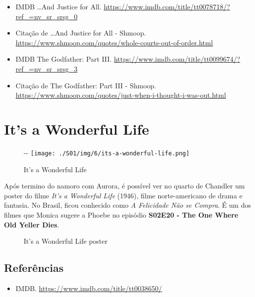 \begin{itemize}
\tightlist
\item
  \sloppy IMDB …And Justice for All. \url{https://www.imdb.com/title/tt0078718/?ref_=nv_sr_srsg_0}
\item
  \sloppy Citação de …And Justice for All - Shmoop. \url{https://www.shmoop.com/quotes/whole-courts-out-of-order.html}
\item
  \sloppy IMDB The Godfather: Part III. \url{https://www.imdb.com/title/tt0099674/?ref_=nv_sr_srsg_3}
\item
  \sloppy Citação de The Godfather: Part III - Shmoop. \url{https://www.shmoop.com/quotes/just-when-i-thought-i-was-out.html}
\end{itemize}

\hypertarget{its-a-wonderful-life}{%
\section{It's a Wonderful Life}\label{its-a-wonderful-life}}

\begin{figure}[!ht]
  \begin{adjustwidth}{-\oddsidemargin-1in}{-\rightmargin}
    \centering
    \texttt{[image: ./S01/img/6/its-a-wonderful-life.png]}
    \caption{It’s a Wonderful Life\label{fig:it-s-a-wonderful-life}}
  \end{adjustwidth}
\end{figure}

Após termino do namoro com Aurora, é possível ver no quarto de Chandler
um poster do filme \emph{It's a Wonderful Life} (1946), filme
norte-americano de drama e fantasia. No Brasil, ficou conhecido como
\emph{A Felicidade Não se Compra}. É um dos filmes que Monica sugere a
Phoebe no episódio
\textbf{\textcolor{primarycolor}{S02E20 - The One Where Old Yeller Dies}}.

\begin{figure}
  \centering
    \caption{It’s a Wonderful Life poster\label{fig:it-s-a-wonderful-life-poster}}
\end{figure}

\hypertarget{referuxeancias-4}{%
\subsection{Referências}\label{referuxeancias-4}}

\begin{itemize}
\tightlist
\item
  \sloppy IMDB. \url{https://www.imdb.com/title/tt0038650/}
\end{itemize}
